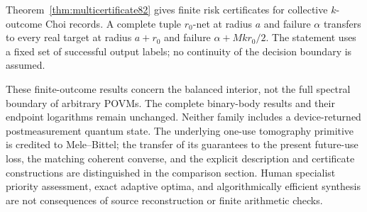Theorem~\ref{thm:multicertificate82} gives finite risk certificates
for collective $k$-outcome Choi records.  A complete tuple $r_0$-net
at radius $a$ and failure $\alpha$ transfers to every real target
at radius $a+r_0$ and failure $\alpha+Mk r_0/2$.
The statement uses a fixed set of successful output labels; no
continuity of the decision boundary is assumed.

These finite-outcome results concern the balanced interior, not the
full spectral boundary of arbitrary POVMs.  The complete binary-body
results and their endpoint logarithms remain unchanged.  Neither
family includes a device-returned postmeasurement quantum state.
The underlying one-use tomography primitive is credited to
Mele--Bittel; the transfer of its guarantees to the present future-use
loss, the matching coherent converse, and the explicit description
and certificate constructions are distinguished in the comparison
section.  Human specialist priority assessment, exact adaptive
optima, and algorithmically efficient synthesis are not consequences
of source reconstruction or finite arithmetic checks.
